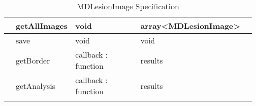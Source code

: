 {\begin{longtable}[H]{  | >{\bfseries}p{2cm} | p{2.2cm} | p{1.5cm} | p{1.5cm} | p{4cm} | }
        & getAllImages & void & array<MDLesionImage> &
            \\ \hline

        & save & void & void &
            \\ \hline

        & getBorder & callback : function & results &
            \\ \hline

        & getAnalysis & callback : function & results &
            \\ \hline



    \caption{MDLesionImage Specification}
    \label{fig:lesionimage_service}
\end{longtable}
}